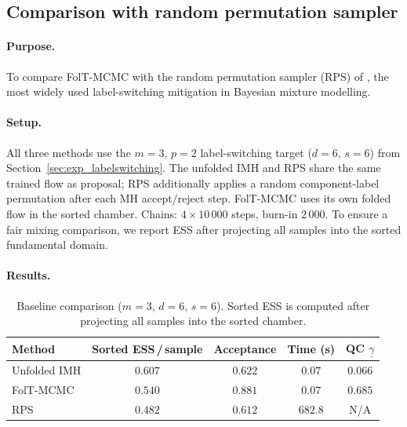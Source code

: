 
\subsection{Comparison with random permutation sampler}
\label{sec:exp_baseline}

\paragraph{Purpose.}
To compare FolT-MCMC with the random permutation sampler
(RPS) of \citet{FruhwirthSchnatter2001}, the most widely used
label-switching mitigation in Bayesian mixture modelling.

\paragraph{Setup.}
All three methods use the $m = 3$, $p = 2$ label-switching target
($d = 6$, $s = 6$) from Section~\ref{sec:exp_labelswitching}.
The unfolded IMH and RPS share the same trained flow as proposal;
RPS additionally applies a random component-label permutation
after each MH accept/reject step.
FolT-MCMC uses its own folded flow in the sorted chamber.
Chains: $4 \times 10\,000$ steps, burn-in $2\,000$.
To ensure a fair mixing comparison, we report ESS after projecting
all samples into the sorted fundamental domain.

\paragraph{Results.}

\begin{table}[t]
\centering
\caption{Baseline comparison ($m = 3$, $d = 6$, $s = 6$).
  Sorted ESS is computed after projecting all samples into the
  sorted chamber.}
\label{tab:baseline}
\smallskip
\begin{tabular}{lcccc}
\hline
Method & Sorted ESS\,/\,sample & Acceptance & Time (s)
       & QC $\underline{\gamma}$ \\
\hline
Unfolded IMH & $0.607$ & $0.622$ & $0.07$ & $0.066$ \\
FolT-MCMC    & $0.540$ & $0.881$ & $0.07$ & $0.685$ \\
RPS          & $0.482$ & $0.612$ & $682.8$ & N/A \\
\hline
\end{tabular}
\end{table}

